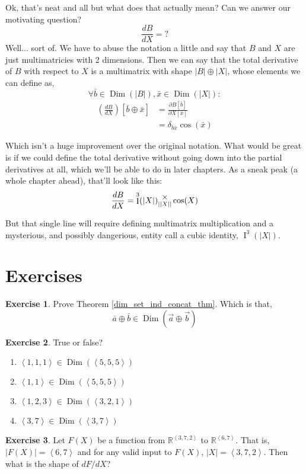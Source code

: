\documentclass[12pt]{book}
\theoremstyle{plain}
\theoremstyle{definition}
\newtheorem{exercise}{Exercise}[chapter]
\theoremstyle{ppart}
\theoremstyle{case}
\theoremstyle{solution}
\DeclareMathOperator{\Dim}{Dim}
\DeclareMathOperator{\Ident}{I}
\newcommand{\mmult}[1]{\text{\raisebox{1ex}{$\underset{#1}{\times}$}}}
\begin{document}
Ok, that's neat and all but what does that actually mean? Can we answer our motivating 
question?
\[\frac{dB}{dX} = ? \]
Well... sort of. We have to abuse the notation a little and say that $B$ and $X$ are
just multimatricies with 2 dimensions. Then we can say that the total derivative
of $B$ with respect to $X$ is a multimatrix with shape $|B| \oplus |X|$,
whose elements we can define as,
\[\forall \bar{b} \in \Dim(|B|), \bar{x} \in \Dim(|X|):\]
\begin{align*}
\left( \frac{dB}{dX} \right)[\bar{b} \oplus \bar{x}]
&= \frac{\partial B[\bar{b}]}{\partial X[\bar{x}]} \\
&= \delta_{\bar{b}\bar{x}}\cos(\bar{x})
\end{align*}

Which isn't a huge improvement over the original notation. What would be great is
if we could define the total derivative without going down into the partial derivatives
at all, which we'll be able to do in later chapters. As a sneak peak (a whole
chapter ahead), that'll look like this:
\[
\frac{dB}{dX} = \Ident^3(|X|) \mmult{||X||} \cos(X)
\]

But that single line will require defining multimatrix multiplication and
a mysterious, and possibly dangerious, entity call a cubic identity, $\Ident^3(|X|)$.

\section{Exercises}

\begin{exercise}
\label{dim_set_ind_concat_ex}
Prove Theorem \ref{dim_set_ind_concat_thm}. Which is that,
\[ \bar{a} \oplus \bar{b} \in \Dim(\vec{a} \oplus \vec{b}) \]
\end{exercise}

\begin{exercise}
True or false?
\begin{enumerate}
\item $\left<1,1,1\right> \in \Dim(\left<5,5,5\right>)$
\item $\left<1,1\right> \in \Dim(\left<5,5,5\right>)$
\item $\left<1,2,3\right> \in \Dim(\left<3,2,1\right>)$
\item $\left<3,7\right> \in \Dim(\left<3,7\right>)$
\end{enumerate}
\end{exercise}

\begin{exercise}
Let $F(X)$ be a function from $\mathbb{R}^{\left<3,7,2\right>}$ to
$\mathbb{R}^{\left<6, 7\right>}$. That is, $|F(X)| = \left<6,7\right>$
and for any valid input to $F(X)$, $|X| = \left<3,7,2\right>$.
Then what is the shape of $dF/dX$?
\end{exercise}
\end{document}
